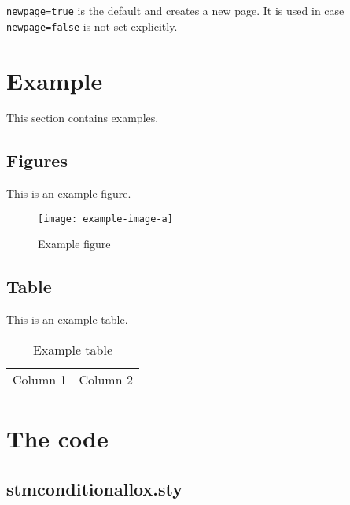 \documentclass[listof=totoc]{scrartcl}
\begin{document}
\texttt{newpage=true} is the default and creates a new page. It is used in case \texttt{newpage=false} is not set explicitly.

\section{Example}

This section contains examples.

\subsection{Figures}

This is an example figure.

\begin{figure}[htbp]
\centering
\texttt{[image: example-image-a]}
\label{fig:example:figure:1}
\caption{Example figure}
\end{figure}

\subsection{Table}

This is an example table.

\begin{table}[htbp]
\centering
\begin{tabular}{ll}
Column 1 & Column 2
\end{tabular}
\label{tab:example:table:1}
\caption{Example table}
\end{table}

% 

\newpage
\appendix

\section{The code}

\subsection{stmconditionallox.sty}


\end{document}
